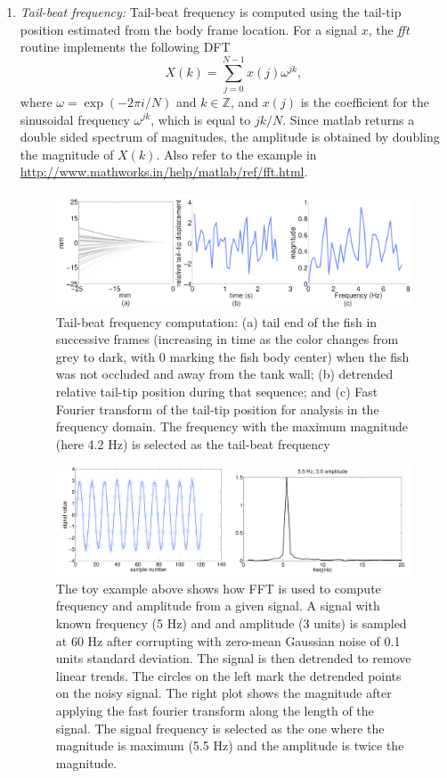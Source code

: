 \documentclass[12pt]{article}
\begin{document}
\begin{enumerate}
\begin{enumerate}
	\end{enumerate}
\item \emph{Tail-beat frequency:} Tail-beat frequency is computed using the tail-tip position estimated from the body frame location. For a signal $x$, the \emph{fft} routine implements the following DFT
\begin{equation}
X(k)=\sum_{j=0}^{N-1}x(j)\omega^{jk},
\end{equation}
where $\omega=\exp(-2\pi i /N)$ and $k \in \mathbb{Z}$, and $x(j)$ is the coefficient for the sinusoidal frequency $\omega^{jk}$, which is equal to $jk/N$. Since matlab returns a double sided spectrum of magnitudes, the amplitude is obtained by doubling the magnitude of $X(k)$. 
Also refer to the example in \url{http://www.mathworks.in/help/matlab/ref/fft.html}.  
\begin{figure}
\centering
\includegraphics[width=.995\linewidth]{tbf_computation}
\caption{Tail-beat frequency computation: (a) tail end of the fish in successive frames (increasing in time as the color changes from grey to dark, with 0 marking the fish body center) when the fish was not occluded and away from the tank wall; (b) detrended relative tail-tip position during that sequence; and (c) Fast Fourier transform of the tail-tip position for analysis in the frequency domain. The frequency with the maximum magnitude (here 4.2 Hz) is selected as the tail-beat frequency}
\label{fig:tbf_computation}
\end{figure}	

\begin{figure}
\centering
\includegraphics[width=.995\linewidth]{fft_example}
\caption{The toy example above shows how FFT is used to compute frequency and amplitude from a given signal. A signal with known frequency (5 Hz) and and amplitude (3 units) is sampled at 60 Hz after corrupting with zero-mean Gaussian noise of 0.1 units standard deviation. The signal is then detrended to remove linear trends. The circles on the left mark the detrended points on the noisy signal. The right plot shows the magnitude after applying the fast fourier transform along the length of the signal. The signal frequency is selected as the one where the magnitude is maximum (5.5 Hz) and the amplitude is twice the magnitude.}
\label{fig:fft_example}
\end{figure}	



\end{enumerate}
\end{document}
